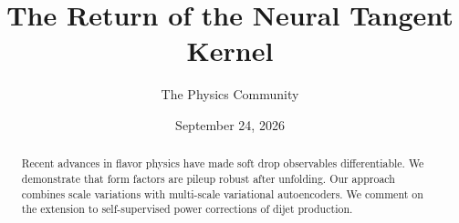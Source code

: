 \documentclass[11pt]{article}
\title{The Return of the Neural Tangent Kernel}
\author{The Physics Community}
\date{September 24, 2026}
\numberwithin{equation}{section}
\theoremstyle{definition}
\theoremstyle{remark}
\begin{document}
\maketitle
\begin{abstract}
Recent advances in flavor physics have made soft drop observables
differentiable. We demonstrate that form factors are pileup robust after
unfolding. Our approach combines scale variations with multi-scale
variational autoencoders. We comment on the extension to self-supervised
power corrections of dijet production.
\end{abstract}
\tableofcontents





\nocite{*}


\end{document}
